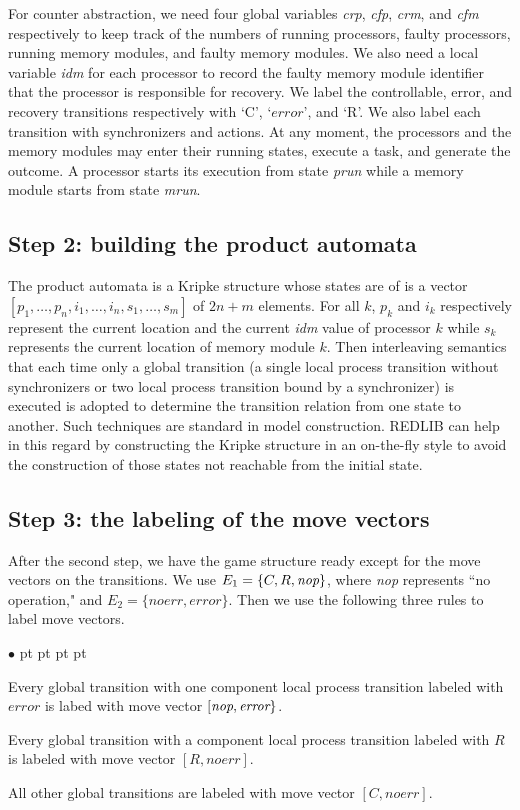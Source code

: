 \documentclass[times,10pt,twocolumn]{article}
\newcommand{\emerr}{\textit{error}}
\newcommand{\emnerr}{\textit{noerr}}
\newenvironment{list1}{\begin{list}{$\bullet$}
{\topsep 0 pt \parsep 0 pt \partopsep 0 pt \itemsep 0
pt}}{\end{list}}
\begin{document}
For counter abstraction, we need four global variables \textit{crp}, \textit{cfp}, 
\textit{crm}, and \textit{cfm} respectively 
to keep track of the numbers of running processors, faulty processors, 
running memory modules, and faulty memory modules. 
We also need a local variable \textit{idm} for each processor to record 
the faulty memory module identifier that the processor is 
responsible for recovery. 
We label the controllable, error, and recovery 
transitions respectively with `C', `$\emerr$', and `R'. 
We also label each transition with synchronizers and actions.  
At any moment, the processors and the memory modules 
may enter their running states, execute a task, and generate 
the outcome. 
A processor starts its execution from state \textit{prun} while 
a memory module starts from state \textit{mrun}. 


\subsection*{Step 2: building the product automata}
The product automata is a Kripke structure whose 
states are of is a vector $[p_1,\ldots,p_n,i_1,\ldots,i_n,s_1,\ldots,s_m]$ 
of $2n+m$ elements.  
For all $k$, $p_k$ and $i_k$ respectively represent the 
current location and the current \textit{idm} value of processor $k$ while 
$s_k$ represents the current location of memory module $k$.  
Then interleaving semantics that each time only a global transition 
(a single local process transition without synchronizers 
or two local process transition bound by a synchronizer) is executed 
is adopted to determine the transition relation from one state to another. 
Such techniques are standard in model construction.  
REDLIB can help in this regard by constructing the Kripke structure in 
an on-the-fly style to avoid the construction of those states not reachable 
from the initial state. 

\subsection*{Step 3: the labeling of the move vectors} 
After the second step, we have the game structure ready except for the 
move vectors on the transitions. 
We use $E_1=\{C,R,\mbox{\em nop}\}$, where {\em nop} represents ``no operation,"
and $E_2=\{\emnerr,\emerr\}$.  
Then we use the following three rules to label move vectors. 
\begin{list1} 
\item Every global transition with one component local process transition labeled 
	with $\emerr$ is labed with move vector $[\mbox{\em nop},\emerr\}$.  
\item Every global transition with a component local process transition labeled 
	with $R$ 	
	is labeled with move vector $[R,\emnerr]$.  
\item All other global transitions are labeled with move vector $[C,\emnerr]$.  
\end{list1} 
\end{document}
